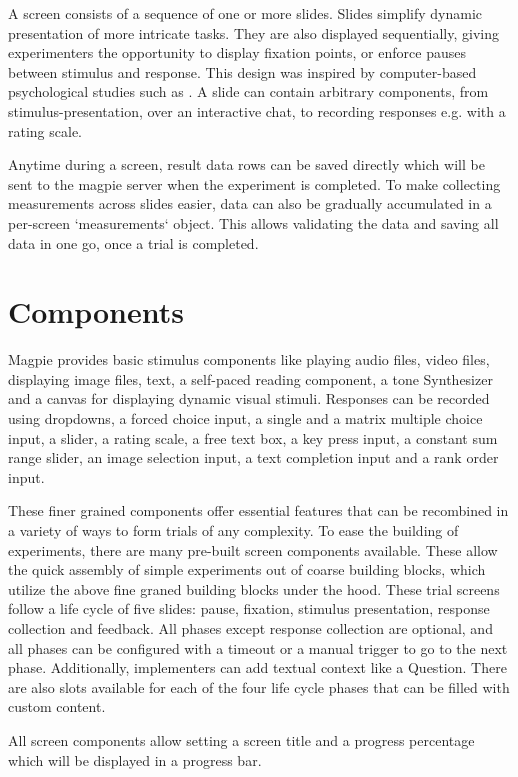 \documentclass[a4paper,11pt]{scrreprt}
\begin{document}
A screen consists of a sequence of one or more slides. Slides simplify dynamic presentation of more intricate tasks. They are also displayed sequentially, giving experimenters the opportunity to display fixation points, or enforce pauses between stimulus and response. This design was inspired by computer-based psychological studies such as \cite{Todd2004}. A slide can contain arbitrary components, from stimulus-presentation, over an interactive chat, to recording responses e.g. with a rating scale.

Anytime during a screen, result data rows can be saved directly which will be sent to the magpie server when the experiment is completed. To make collecting measurements across slides easier, data can also be gradually accumulated in a per-screen `measurements` object. This allows validating the data and saving all data in one go, once a trial is completed.

\section{Components}
Magpie provides basic stimulus components like playing audio files, video files, displaying image files, text, a self-paced reading component, a tone Synthesizer and a canvas for displaying dynamic visual stimuli. Responses can be recorded using dropdowns, a forced choice input, a single and a matrix multiple choice input, a slider, a rating scale, a free text box, a key press input, a constant sum range slider, an image selection input, a text completion input and a rank order input.

These finer grained components offer essential features that can be recombined in a variety of ways to form trials of any complexity.
To ease the building of experiments, there are many pre-built screen components available. These allow the quick assembly of simple experiments out of coarse building blocks, which utilize the above fine graned building blocks under the hood. These trial screens follow a life cycle of five slides: pause, fixation, stimulus presentation, response collection and feedback. All phases except response collection are optional, and all phases can be configured with a timeout or a manual trigger to go to the next phase. Additionally, implementers can add textual context like a Question. There are also slots available for each of the four life cycle phases that can be filled with custom content.

All screen components allow setting a screen title and a progress percentage which will be displayed in a progress bar.
\end{document}
